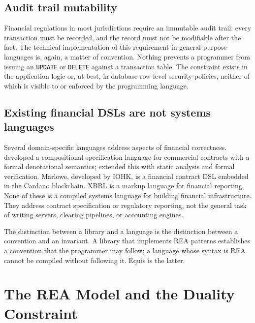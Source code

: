 \documentclass[11pt,a4paper]{article}
\theoremstyle{remark}
\begin{document}
\subsection{Audit trail mutability}

Financial regulations in most jurisdictions require an immutable audit
trail: every transaction must be recorded, and the record must not be
modifiable after the fact. The technical implementation of this
requirement in general-purpose languages is, again, a matter of
convention. Nothing prevents a programmer from issuing an
\texttt{UPDATE} or \texttt{DELETE} against a transaction table. The
constraint exists in the application logic or, at best, in database
row-level security policies, neither of which is visible to or enforced
by the programming language.

\subsection{Existing financial DSLs are not systems languages}

Several domain-specific languages address aspects of financial
correctness. \citet{andersen_compositional_2006} developed a compositional
specification language for commercial contracts with a formal
denotational semantics; \citet{henglein_formally_2020} extended this with
static analysis and formal verification. Marlowe, developed by IOHK, is a
financial contract DSL embedded in the Cardano blockchain. XBRL is a
markup language for financial reporting. None of these is a compiled
systems language for building financial infrastructure. They address
contract specification or regulatory reporting, not the general task of
writing servers, clearing pipelines, or accounting engines.

The distinction between a library and a language is the distinction
between a convention and an invariant. A library that implements REA
patterns establishes a convention that the programmer may follow; a
language whose syntax is REA cannot be compiled without following it.
Equis is the latter.

\section{The REA Model and the Duality Constraint}\label{sec:rea}
\end{document}
